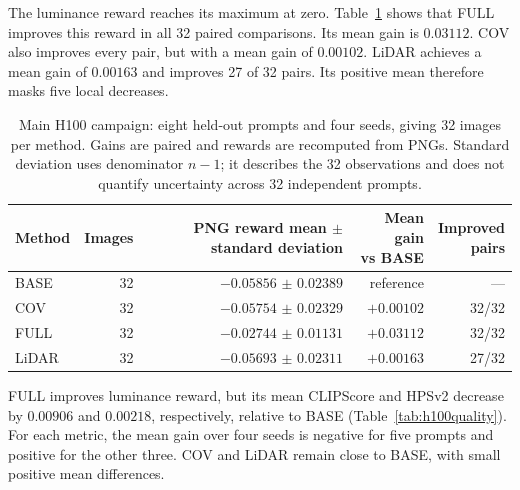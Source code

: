 \documentclass[11pt,a4paper]{article}
\begin{document}
The luminance reward reaches its maximum at zero. Table~\ref{tab:h100reward} shows that FULL improves this reward in all 32 paired comparisons. Its mean gain is $0.03112$. COV also improves every pair, but with a mean gain of $0.00102$. LiDAR achieves a mean gain of $0.00163$ and improves 27 of 32 pairs. Its positive mean therefore masks five local decreases.

\begin{table}[!htb]
\centering\small
\setlength{\tabcolsep}{5pt}
\begin{tabular}{lrrrr}
\toprule
Method & Images & \shortstack{PNG reward\\mean $\pm$ standard deviation} & \shortstack{Mean gain\\vs BASE} & \shortstack{Improved\\pairs}\\
\midrule
BASE & 32 & $-0.05856$ $\pm$ $0.02389$ & reference & ---\\
COV & 32 & $-0.05754$ $\pm$ $0.02329$ & $+0.00102$ & 32/32\\
FULL & 32 & $-0.02744$ $\pm$ $0.01131$ & $+0.03112$ & 32/32\\
LiDAR & 32 & $-0.05693$ $\pm$ $0.02311$ & $+0.00163$ & 27/32\\
\bottomrule
\end{tabular}
\caption{Main H100 campaign: eight held-out prompts and four seeds, giving 32 images per method. Gains are paired and rewards are recomputed from PNGs. Standard deviation uses denominator $n-1$; it describes the 32 observations and does not quantify uncertainty across 32 independent prompts.}
\label{tab:h100reward}
\end{table}

FULL improves luminance reward, but its mean CLIPScore and HPSv2 decrease by $0.00906$ and $0.00218$, respectively, relative to BASE (Table~\ref{tab:h100quality}). For each metric, the mean gain over four seeds is negative for five prompts and positive for the other three. COV and LiDAR remain close to BASE, with small positive mean differences.
\end{document}

